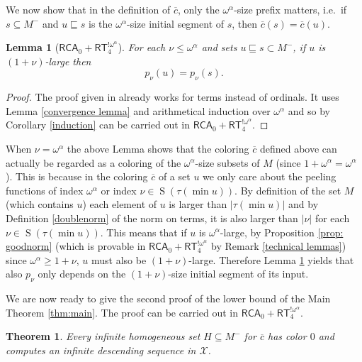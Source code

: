 \documentclass[11pt]{amsart}
\newtheorem{theorem}[thm]{Theorem}
\newtheorem{lemma}[thm]{Lemma}
\theoremstyle{definition}
\theoremstyle{remark}
\theoremstyle{plain}
\renewcommand{\S}{\operatorname{S}}
\def\X{\mathcal{X}}
\def\om{\omega}
\def\a{\alpha}
\newcommand{\RCA}{\mathsf{RCA}_0}
\newcommand{\RT}{\mathsf{RT}}
\newcommand{\lorenzo}[1]{\textcolor{blue}{#1}}
\begin{document}
We now show that in the definition of $\overline{c}$, only the $\om^\a$-size prefix matters, i.e.\ if $s \subseteq M^-$ and $u \sqsubseteq s$ is the $\om^\a$-size initial segment of $s$, then $\overline{c}(s) = \overline{c}(u)$.
		
\begin{lemma}[$\RCA + \RT^{! \om^\a}_4$]\label{lem: prefix coloring}
For each $\nu \le \om^\a$ and sets $u \sqsubseteq s \subset M^-$, if $u$ is $(1 + \nu)$-large then
$$p_\nu (u) = p_\nu (s).$$
\end{lemma}
		
\begin{proof}
The proof given in \cite[Lemma 6.13]{marcone2025} already works for terms instead of ordinals.
It uses Lemma \ref{convergence lemma} and arithmetical induction over $\om^\a$ and so by Corollary \ref{induction} can be carried out in $\RCA + \RT^{! \om^\a}_4$.
\end{proof}

When $\nu = \om^\a$ the above Lemma shows that the coloring $\overline{c}$ defined above can actually be regarded as a coloring of the $\om^\a$-size subsets of $M$ (since $1+\om^\a = \om^\a$).
This is because in the coloring $\overline{c}$ of a set $u$ we only care about the peeling functions of index $\om^\a$ or index $\nu \in \S(\tau(\min u))$.
By definition of the set $M$ (which contains $u$) each element of $u$ is larger than $|\tau(\min u)|$ and by Definition \ref{doublenorm} of the norm on terms, it is also larger than $|\nu|$ for each $\nu \in \S(\tau(\min u))$.
This means that if $u$ is $\om^\a$-large, by Proposition \ref{prop: goodnorm} (which is provable in $\RCA + \RT^{! \om^\a}_4$ by Remark \ref{technical lemmas}) since $\om^\a \ge 1+\nu$, $u$ must also be $(1+\nu)$-large.
Therefore Lemma \ref{lem: prefix coloring} yields that also $p_\nu$ only depends on the $(1+\nu)$-size initial segment of its input.

We are now ready to give the second proof of the lower bound of the Main Theorem \ref{thm:main}.
The proof can be carried out in $\RCA + \RT^{! \om^\a}_4$.


\begin{theorem}\label{th:homog sets}
Every infinite homogeneous set $H\subseteq M^-$ for $\overline{c}$ has color $0$ and computes an infinite descending sequence in $\X$.
\end{theorem}
\end{document}
